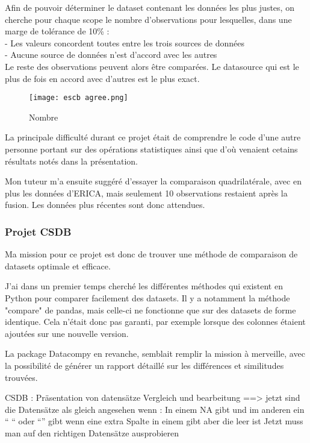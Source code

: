 Afin de pouvoir déterminer le dataset contenant les données les plus justes, on cherche pour chaque scope le nombre d'observations pour lesquelles, dans une marge de tolérance de 10\% : \\
- Les valeurs concordent toutes entre les trois sources de données \\
- Aucune source de données n'est d'accord avec les autres\\

Le reste des observations peuvent alors être comparées. Le datasource qui est le plus de fois en accord avec d'autres est le plus exact.
\begin{figure}[H]
    \centering
    \texttt{[image: escb agree.png]}
    \caption{Nombre }
\end{figure}

La principale difficulté durant ce projet était de comprendre le code d'une autre personne portant sur des opérations statistiques ainsi que d'où venaient cetains résultats notés dans la présentation.

Mon tuteur m'a ensuite suggéré d'essayer la comparaison quadrilatérale, avec en plus les données d'ERICA, mais seulement 10 observations restaient après la fusion. 
Les données plus récentes sont donc attendues.

\subsubsection{Projet CSDB}

Ma mission pour ce projet est donc de trouver une méthode de comparaison de datasets optimale et efficace.

J'ai dans un premier temps cherché les différentes méthodes qui existent en Python pour comparer facilement des datasets.
Il y a notamment la méthode "compare" de pandas, mais celle-ci ne fonctionne que sur des datasets de forme identique.
Cela n'était donc pas garanti, par exemple lorsque des colonnes étaient ajoutées sur une nouvelle version.

La package Datacompy en revanche, semblait remplir la mission à merveille, avec la possibilité de générer un rapport détaillé sur les différences et similitudes trouvées.

CSDB : Präsentation von datensätze Vergleich und bearbeitung ==> jetzt sind die Datensätze als gleich angesehen wenn : 
In einem NA gibt und im anderen ein “ “ oder “” gibt
wenn eine extra Spalte in einem gibt aber die leer ist
Jetzt muss man auf den richtigen Datensätze ausprobieren


